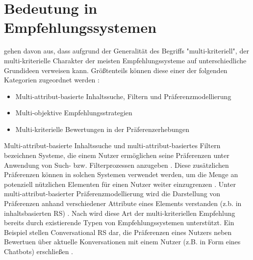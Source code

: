 

\section{Bedeutung in Empfehlungssystemen}
\textcite[S. 849]{adomavicius:4:inbook} gehen davon aus, dass aufgrund der Generalität des Begriffs "multi-kriteriell", der multi-kriterielle Charakter \cite[S. 10]{adomavicius:5:inbook} der meisten Empfehlungssysteme auf unterschiedliche Grundideen verweisen kann.
Größtenteils können diese einer der folgenden Kategorien zugeordnet werden \cite[S. 10]{adomavicius:5:inbook}\cite[S. 849]{adomavicius:4:inbook}:
\begin{itemize}
    \item Multi-attribut-basierte Inhaltssuche, Filtern und Präferenzmodellierung
    \item Multi-objektive Empfehlungsstrategien
    \item Multi-kriterielle Bewertungen in der Präferenzerhebungen
\end{itemize}

Multi-attribut-basierte Inhaltssuche und multi-attribut-basiertes Filtern bezeichnen Systeme, die einem Nutzer ermöglichen seine Präferenzen unter Anwendung von Such- bzw. Filterprozessen anzugeben \cite[S. 10]{adomavicius:5:inbook}.
Diese zusätzlichen Präferenzen können in solchen Systemen verwendet werden, um die Menge an potenziell nützlichen Elementen für einen Nutzer weiter einzugrenzen \cite[S. 11]{adomavicius:5:inbook}.
Unter multi-attribut-basierter Präferenzmodellierung wird die Darstellung von Präferenzen anhand verschiedener Attribute eines Elements verstanden (z.b. in inhaltsbasierten \ac{RS}) \cite[S. 10]{adomavicius:5:inbook}.
Nach \textcite[S. 850]{adomavicius:4:inbook} wird diese Art der multi-kriteriellen Empfehlung bereits durch existierende Typen von Empfehlungssystemen unterstützt.
Ein Beispiel stellen Conversational \ac{RS} dar, die Präferenzen eines Nutzers neben Bewertuen über aktuelle Konversationen mit einem Nutzer (z.B. in Form eines Chatbots) erschließen \cite[S. 1]{yueming:article}.

